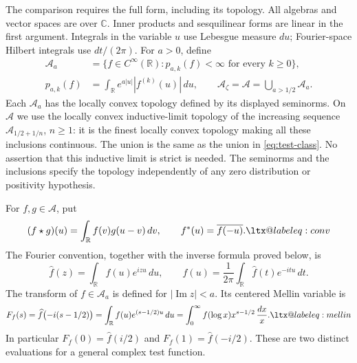 \documentclass[11pt]{article}
\makeatletter
\theoremstyle{definition}
\theoremstyle{remark}
\numberwithin{equation}{section}
\newcommand{\cA}{\mathcal A}
\newcommand{\R}{\mathbb R}
\newcommand{\C}{\mathbb C}
\newcommand{\A}{\mathcal A}
\newcommand{\alsoeq}[1]{\ltx@label{#1}}
\makeatother
\begin{document}
The comparison requires the full form, including its topology.  All algebras and
vector spaces are over \(\C\).  Inner products and sesquilinear forms are
linear in the first argument.  Integrals in the variable \(u\) use
Lebesgue measure \(du\); Fourier-space Hilbert integrals use
\(dt/(2\pi)\).
For \(a>0\), define
\begin{equation}
 \begin{aligned}
 \A_a&=\{f\in C^\infty(\R):p_{a,k}(f)<\infty
                                  \text{ for every }k\geq0\},\\
 p_{a,k}(f)&=\int_\R e^{a|u|}|f^{(k)}(u)|\,du,\qquad
 \cA_\zeta=\A=\bigcup_{a>1/2}\A_a.
 \end{aligned}
 \label{eq:test-class}
\end{equation}
Each \(\A_a\) has the locally convex topology defined by its displayed
seminorms.  On \(\A\) we use the locally convex inductive-limit topology
of the increasing sequence \(\A_{1/2+1/n}\), \(n\geq1\): it is the
finest locally convex topology making all these inclusions continuous.
The union is the same as the union in \eqref{eq:test-class}.
No assertion that this inductive limit is strict is needed.
The seminorms and the inclusions specify the topology independently of
any zero distribution or positivity hypothesis.

For \(f,g\in\A\), put
\begin{equation}
 (f\star g)(u)=\int_\R f(v)g(u-v)\,dv,
 \qquad f^*(u)=\overline{f(-u)}.
 \label{eq:operations}\alsoeq{eq:conv}
\end{equation}
The Fourier convention, together with the inverse formula proved below,
is
\begin{equation}
 \widehat f(z)=\int_\R f(u)e^{izu}\,du,
 \qquad f(u)=\frac1{2\pi}\int_\R\widehat f(t)e^{-itu}\,dt.
 \label{eq:fourier}
\end{equation}
The transform of \(f\in\A_a\) is defined for
\(|\operatorname{Im}z|<a\).  Its centered Mellin variable is
\begin{equation}
 F_f(s)=\widehat f\bigl(-i(s-1/2)\bigr)
       =\int_\R f(u)e^{(s-1/2)u}\,du
       =\int_0^\infty f(\log x)x^{s-1/2}\,\frac{dx}{x}.
 \label{eq:centered-mellin}\alsoeq{eq:mellin}
\end{equation}
In particular \(F_f(0)=\widehat f(i/2)\) and
\(F_f(1)=\widehat f(-i/2)\).  These are two distinct evaluations for a
general complex test function.
\end{document}

